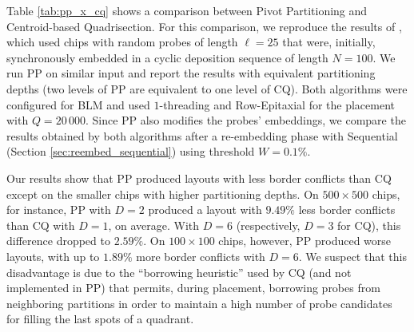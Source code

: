 Table \ref{tab:pp_x_cq} shows a comparison between Pivot Partitioning and
Centroid-based Quadrisection. For this comparison, we reproduce the results of
\citet{Kahng2003a}, which used chips with random probes of length $\ell=25$ that
were, initially, synchronously embedded in a cyclic deposition sequence of
length $N=100$. We run PP on similar input and report the results with
equivalent partitioning depths (two levels of PP are equivalent to one level of
CQ). Both algorithms were configured for BLM and used $1$-threading and
Row-Epitaxial for the placement with $Q = 20\,000$. Since PP also modifies the
probes' embeddings, we compare the results obtained by both algorithms after a
re-embedding phase with Sequential (Section \ref{sec:reembed_sequential}) using
threshold $W=0.1\%$.

Our results show that PP produced layouts with less border conflicts than CQ
except on the smaller chips with higher partitioning depths. On $500\times 500$
chips, for instance, PP with $D=2$ produced a layout with $9.49\%$ less border
conflicts than CQ with $D=1$, on average. With $D=6$ (respectively, $D=3$ for
CQ), this difference dropped to $2.59\%$. On $100\times 100$ chips, however, PP
produced worse layouts, with up to $1.89\%$ more border conflicts with $D=6$.
We suspect that this disadvantage is due to the ``borrowing heuristic'' used by
CQ (and not implemented in PP) that permits, during placement, borrowing probes
from neighboring partitions in order to maintain a high number of probe
candidates for filling the last spots of a quadrant.

